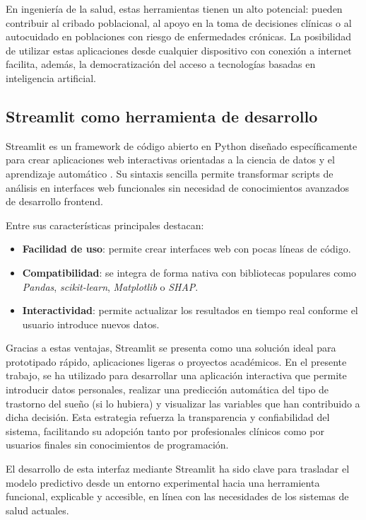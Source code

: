 En ingeniería de la salud, estas herramientas tienen un alto potencial: pueden contribuir al cribado poblacional, al apoyo en la toma de decisiones clínicas o al autocuidado en poblaciones con riesgo de enfermedades crónicas. La posibilidad de utilizar estas aplicaciones desde cualquier dispositivo con conexión a internet facilita, además, la democratización del acceso a tecnologías basadas en inteligencia artificial.

\subsection{Streamlit como herramienta de desarrollo}
Streamlit es un framework de código abierto en Python diseñado específicamente para crear aplicaciones web interactivas orientadas a la ciencia de datos y el aprendizaje automático \cite{streamlit}. Su sintaxis sencilla permite transformar scripts de análisis en interfaces web funcionales sin necesidad de conocimientos avanzados de desarrollo frontend.

Entre sus características principales destacan:
\begin{itemize}
    \item \textbf{Facilidad de uso}: permite crear interfaces web con pocas líneas de código.
    \item \textbf{Compatibilidad}: se integra de forma nativa con bibliotecas populares como \textit{Pandas}, \textit{scikit-learn}, \textit{Matplotlib} o \textit{SHAP}.
    \item \textbf{Interactividad}: permite actualizar los resultados en tiempo real conforme el usuario introduce nuevos datos.
\end{itemize}

Gracias a estas ventajas, Streamlit se presenta como una solución ideal para prototipado rápido, aplicaciones ligeras o proyectos académicos. En el presente trabajo, se ha utilizado para desarrollar una aplicación interactiva que permite introducir datos personales, realizar una predicción automática del tipo de trastorno del sueño (si lo hubiera) y visualizar las variables que han contribuido a dicha decisión. Esta estrategia refuerza la transparencia y confiabilidad del sistema, facilitando su adopción tanto por profesionales clínicos como por usuarios finales sin conocimientos de programación.

El desarrollo de esta interfaz mediante Streamlit ha sido clave para trasladar el modelo predictivo desde un entorno experimental hacia una herramienta funcional, explicable y accesible, en línea con las necesidades de los sistemas de salud actuales.


